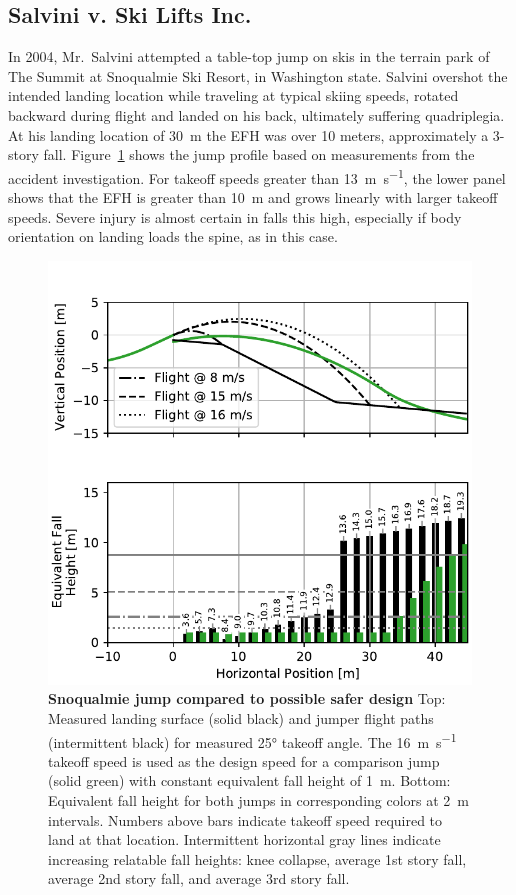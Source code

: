 \documentclass[smallextended]{svjour3}       %
\begin{document}
\subsection{Salvini v. Ski Lifts Inc.}
\label{sec:salvini}
%
In 2004, Mr.~Salvini attempted a table-top jump on skis in the terrain park of
The Summit at Snoqualmie Ski Resort, in Washington state. Salvini overshot the
intended landing location while traveling at typical skiing speeds, rotated
backward during flight and landed on his back, ultimately suffering
quadriplegia. At his landing location of 30~\si{\meter} the EFH was over 10
meters, approximately a 3-story fall.  Figure~\ref{fig:salvini-v-snoqualmie}
shows the jump profile based on measurements from the accident investigation.
For takeoff speeds greater than 13~\si{\meter\per\second}, the lower panel
shows that the EFH is greater than 10~\si{\meter} and grows linearly with
larger takeoff speeds. Severe injury is almost certain in falls this high,
especially if body orientation on landing loads the spine, as in this case.
%
\begin{figure}
  \centering
  \includegraphics[width=\columnwidth]{figures/salvini-v-snoqualmie.pdf}
  \caption{\textbf{Snoqualmie jump compared to possible safer design}
  Top: Measured landing surface (solid black) and jumper flight paths
  (intermittent black) for measured 25\si{\degree} takeoff angle. The
  16~\si{\meter\per\second} takeoff speed is used as the design speed for a
  comparison jump (solid green) with constant equivalent fall height of
  1~\si{\meter}.
  Bottom: Equivalent fall height for both jumps in corresponding colors at
  2~\si{\meter} intervals. Numbers above bars indicate takeoff speed required
  to land at that location.
  Intermittent horizontal gray lines indicate increasing relatable fall
  heights: knee collapse, average 1st story fall, average 2nd story fall, and
  average 3rd story fall.
  }
  \label{fig:salvini-v-snoqualmie}
\end{figure}
\end{document}
